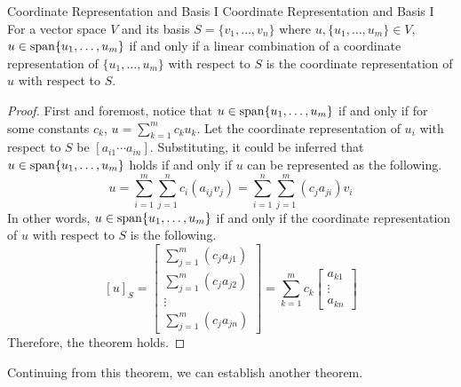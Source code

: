 \documentclass[../main.tex]{subfiles}
\begin{document}
\begin{theorem}{Coordinate Representation and Basis I}
{Coordinate Representation and Basis I}
For a vector space $V$ and its basis $S = \{ v_1, \ldots, v_n \}$
where $u, \{ u_1, \ldots, u_m \} \in V$, $u \in \operatorname{span}\{ u_1, \ldots,
u_m \}$ if and only if a linear combination of a coordinate
representation of $\{ u_1, \ldots, u_m \}$ with respect to $S$ is the
coordinate representation of $u$ with respect to $S$.
\end{theorem}
\begin{proof}
First and foremost, notice that $u \in \operatorname{span}\{ u_1, \ldots, u_m \}$
if and only if for some constants $c_k$, $u = \sum_{k=1}^m c_k u_k$.
Let the coordinate representation of $u_i$ with respect to $S$ be
$[a_{i1} \cdots a_{in}]$. Substituting, it could be inferred that
$u \in \operatorname{span}\{ u_1, \ldots, u_m \}$ holds if and only if $u$
can be represented as the following.
\[
u
= \sum_{i=1}^m \sum_{j=1}^n c_i (a_{ij} v_j)
= \sum_{i=1}^n \sum_{j=1}^m (c_j a_{ji}) v_i
\]
In other words, $u \in \operatorname{span}\{ u_1, \ldots, u_m \}$ if and only if
the coordinate representation of $u$ with respect to $S$ is the
following.
\[
[u]_S =
\begin{bmatrix}
    \sum_{j=1}^m (c_j a_{j1}) \\
    \sum_{j=1}^m (c_j a_{j2}) \\
    \vdots \\
    \sum_{j=1}^m (c_j a_{jn})
\end{bmatrix}
=
\sum_{k=1}^m
c_k
\begin{bmatrix}
    a_{k1} \\
    \vdots \\
    a_{kn}
\end{bmatrix}
\]
Therefore, the theorem holds.
\end{proof}

Continuing from this theorem, we can establish another theorem.
\end{document}
